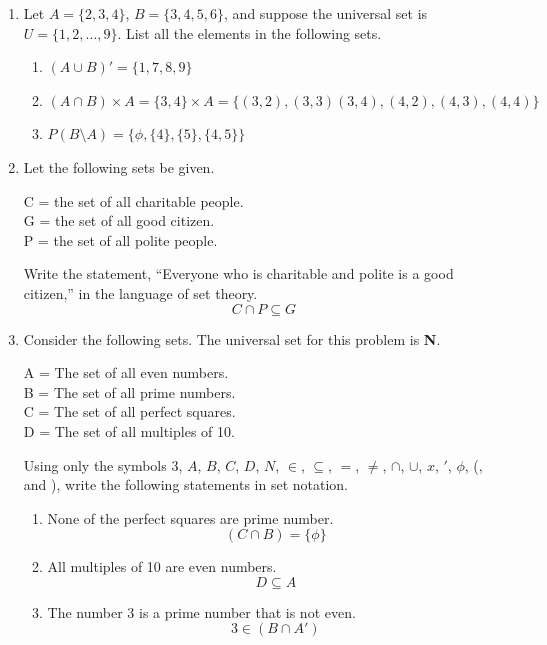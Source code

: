 \documentclass[12pt]{article}
\begin{document}
\begin{enumerate}
\begin{center}
    \end{center}
  \item Let $A = \{2, 3, 4\}$, $B = \{3, 4, 5, 6\}$, and suppose the universal set is $U = \{1, 2, …, 9\}$. List all the elements in the following sets.
  \begin{enumerate}
    \item $(A \cup B)' = \{1,7,8,9\}$
    \item $(A \cap B) \times A = \{3,4\} \times A = \{(3,2),(3,3)(3,4),(4,2),(4,3),(4,4)\}$ 
    \item $P(B\setminus A) = \{\phi, \{4\}, \{5\}, \{4,5\}\}$
  \end{enumerate}
  \newpage
  \item Let the following sets be given.
  \begin{center}
    C = the set of all charitable people.\\
    G = the set of all good citizen.\\
    P = the set of all polite people.\\
  \end{center}
    Write the statement, “Everyone who is charitable and polite is a good citizen,” in the language of set theory.
    \[C \cap P \subseteq G\]
  \item Consider the following sets. The universal set for this problem is \textbf{N}.
  \begin{center}
    A = The set of all even numbers.\\
    B = The set of all prime numbers.\\
    C = The set of all perfect squares.\\
    D = The set of all multiples of 10.\\
  \end{center}
  Using only the symbols 3, $A$, $B$, $C$, $D$, $N$, $\in$, $\subseteq$, $=$, $\neq$, $\cap$, $\cup$, $x$, $'$, $\phi$, (, and ), write the following statements in set notation.
  \begin{enumerate}
    \item None of the perfect squares are prime number.
      \[(C \cap B) = \{\phi\}\]
    \item All multiples of 10 are even numbers.
      \[D \subseteq A\]
    \item The number 3 is a prime number that is not even.
      \[3 \in (B \cap A')\]

\end{enumerate}
\end{enumerate}
\end{document}
